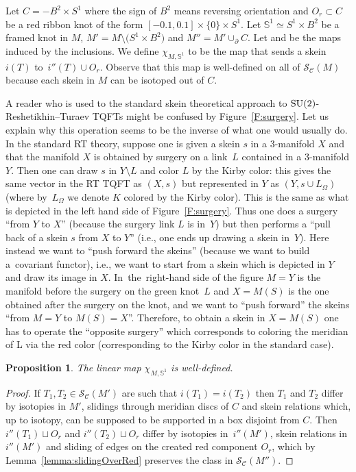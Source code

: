 \documentclass[10pt,a4paper]{amsart}
\newtheorem{proposition}{Proposition}
\numberwithin{equation}{section}
\newcommand{\tto}{\xrightarrow}
\numberwithin{theorem}{section}
\numberwithin{proposition}{section}
\numberwithin{definition}{section}
\numberwithin{lemma}{section}
\numberwithin{corollary}{section}
\numberwithin{remark}{section}
\numberwithin{example}{section}
\newcommand{\cat}{\mathcal{C}}
\newcommand{\TSkein}{{\mathscr{S}}}
\newcommand{\Sp}{\mathbb{S}}
\begin{document}
Let $C=-B^2\times S^1$ where the sign of $B^2$ means reversing
orientation and $O_r\subset C$
be a red ribbon knot of the form
$[-0.1,0.1]\times\{0\}\times S^1$. Let $\Sp^1\simeq S^1\times B^2$ be
a framed knot in $M$, $M'=M\setminus \bigl(S^1\times B^2\bigr)$ and
$M''=M'\cup_\partial C$. Let \smash{$\TSkein_\cat(M')\tto i\TSkein_\cat(M)$} and \smash{$\TSkein_\cat(M')\tto {i''}\TSkein_\cat(M'')$} be the
maps induced by the inclusions. We define $\chi_{M,\Sp^1}$ to be the
map that sends a skein $i(T)$ to~$i''(T)\cup O_r$.
 Observe that this map is well-defined on all of $\TSkein_\cat(M)$ because each skein in $M$ can be isotoped
 out of
 $C$.
\begin{remark}
A reader who is used to the standard skein theoretical approach to ${\rm SU}(2)$-Reshetikhin--Turaev TQFTs might be confused by Figure~\ref{F:surgery}. Let us explain why this operation seems to be the inverse of what one would usually do.
In the standard RT theory, suppose one is given a skein $s$ in a $3$-manifold $X$ and that the manifold $X$ is obtained by surgery on a link~$L$ contained in a $3$-manifold $Y$. Then one can draw $s$ in $Y\setminus L$ and color $L$ by the Kirby color: this gives the same vector in the RT TQFT as $(X,s)$ but represented in $Y$ as $(Y,s\cup L_\Omega)$ (where by~$L_\Omega$ we denote $K$ colored by the Kirby color). This is the same as what is depicted in the left hand side of Figure~\ref{F:surgery}.
Thus one does a surgery ``from $Y$ to $X$'' (because the surgery link $L$ is in~$Y$) but then performs a ``pull back of a skein $s$ from $X$ to $Y$'' (i.e., one ends up drawing a skein in~$Y$).
Here instead we want to ``push forward the skeins'' (because we want to build a~covariant functor), i.e., we want to start from a skein which is depicted in $Y$ and draw its image in $X$.
In~the~right-hand side of the figure $M=Y$ is the manifold before the surgery on the green knot~$L$ and $X=M(S)$ is the one obtained after the surgery on the knot, and we want to ``push forward'' the skeins ``from $M=Y$ to $M(S)=X$''. Therefore, to obtain a skein in $X=M(S)$ one has to operate the ``opposite surgery'' which corresponds to coloring the meridian of L via the red color (corresponding to the Kirby color in the standard case).
\end{remark}
\begin{proposition}
 The linear map $\chi_{M,\Sp^1}$ is well-defined.
\end{proposition}
\begin{proof}
If $T_1,T_2\in \TSkein_\cat(M')$ are such that $i(T_1)=i(T_2)$ then $T_1$ and $T_2$ differ by isotopies in $M'$, slidings through meridian discs of $C$ and skein relations which, up to isotopy, can be supposed to be supported in a box disjoint from $C$.
 Then $i''(T_1)\sqcup O_r$ and $i''(T_2)\sqcup O_r$ differ by isotopies in~$i''(M')$, skein relations in $i''(M')$ and sliding of edges on the created red component $O_r$, which by Lemma~\ref{lemma:slidingOverRed} preserves the class in $\TSkein_\cat(M'')$.
\end{proof}
\end{document}

